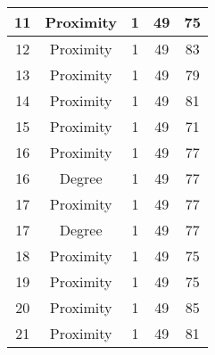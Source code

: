 \documentclass[results.tex]{subfiles}
\begin{document}
\begin{center}
\begin{tabular}{| c || c | c | c | c |}
            \hline
            11                      & Proximity                    & 1                      & 49                      & 75                   \\
            \hline
            12                      & Proximity                    & 1                      & 49                      & 83                   \\
            \hline
            13                      & Proximity                    & 1                      & 49                      & 79                   \\
            \hline
            14                      & Proximity                    & 1                      & 49                      & 81                   \\
            \hline
            15                      & Proximity                    & 1                      & 49                      & 71                   \\
            \hline
            16                      & Proximity                    & 1                      & 49                      & 77                   \\
            \hline
            16                      & Degree                       & 1                      & 49                      & 77                   \\
            \hline
            17                      & Proximity                    & 1                      & 49                      & 77                   \\
            \hline
            17                      & Degree                       & 1                      & 49                      & 77                   \\
            \hline
            18                      & Proximity                    & 1                      & 49                      & 75                   \\
            \hline
            19                      & Proximity                    & 1                      & 49                      & 75                   \\
            \hline
            20                      & Proximity                    & 1                      & 49                      & 85                   \\
            \hline
            21                      & Proximity                    & 1                      & 49                      & 81                   \\

\end{tabular}
\end{center}
\end{document}
